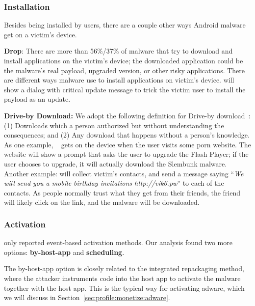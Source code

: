 \subsubsection{Installation}
\label{sec:profile:behavior:inst}

Besides being installed by users, there are a couple other ways Android malware
get on a victim's device.

{\bf Drop}: There are more than 56\%/37\% of malware that try to download and install
applications on the victim's device; the downloaded
application could be the malware's real payload,
upgraded version, or other risky applications.
There are different ways malware use to install applications on victim's device.
 will show a dialog with critical update message to trick
the victim user to install the payload as an update.

{\bf Drive-by Download:}
We adopt the following definition for Drive-by download~\cite{drivebydownload}:
(1) Downloads which a person authorized but without understanding the consequences; and
(2) Any download that happens without a person's knowledge.
As one example,
~\cite{slemBunk1,slemBunk2} gets on the device when the user visits some porn website.
The website will show a prompt that asks the user to
upgrade the Flash Player; if the user chooses to upgrade, 
it will actually download the Slembunk malware.
Another example:  will collect victim's contacts, and send a message saying 
``{\em We will send you a mobile birthday invitations http://vik6.pw}'' to each of the contacts.
As people normally trust what they get from their friends, the friend will likely click
on the link, and the malware will be downloaded.

\vspace{-0.1in}
\subsubsection{Activation}
\label{sec:profile:behavior:act}

\genome only reported event-based activation methods.
Our analysis found two more options:
{\bf by-host-app} and {\bf scheduling}.

The by-host-app option is closely related to the integrated repackaging method, where the attacker
instruments code into the host app to activate the malware together with the host app.
This is the typical way for activating adware, which we will discuss
in Section~\ref{sec:profile:monetize:adware}.

